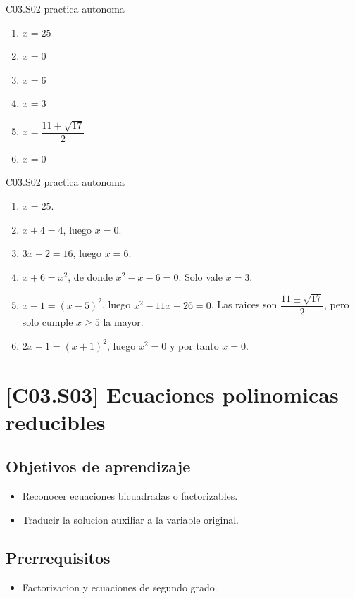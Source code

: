 \begin{shortanswer}{C03.S02 practica autonoma}
\begin{enumerate}[label=\textbf{PX-C03.S02-\arabic*:}, leftmargin=*]
  \item \(x=25\)
  \item \(x=0\)
  \item \(x=6\)
  \item \(x=3\)
  \item \(x=\dfrac{11+\sqrt{17}}{2}\)
  \item \(x=0\)
\end{enumerate}
\end{shortanswer}

\begin{fullsolution}{C03.S02 practica autonoma}
\begin{enumerate}[label=\textbf{PX-C03.S02-\arabic*:}, leftmargin=*]
  \item \(x=25\).
  \item \(x+4=4\), luego \(x=0\).
  \item \(3x-2=16\), luego \(x=6\).
  \item \(x+6=x^2\), de donde \(x^2-x-6=0\). Solo vale \(x=3\).
  \item \(x-1=(x-5)^2\), luego \(x^2-11x+26=0\). Las raices son \(\dfrac{11\pm\sqrt{17}}{2}\), pero solo cumple \(x\geq 5\) la mayor.
  \item \(2x+1=(x+1)^2\), luego \(x^2=0\) y por tanto \(x=0\).
\end{enumerate}
\end{fullsolution}

\section{[C03.S03] Ecuaciones polinomicas reducibles}

\subsection*{Objetivos de aprendizaje}
\begin{itemize}
  \item Reconocer ecuaciones bicuadradas o factorizables.
  \item Traducir la solucion auxiliar a la variable original.
\end{itemize}

\subsection*{Prerrequisitos}
\begin{itemize}
  \item Factorizacion y ecuaciones de segundo grado.
\end{itemize}

